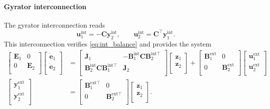 \documentclass{svjour3}                     %
\begin{document}
\paragraph{Gyrator interconnection}
The gyrator interconnection reads
\begin{equation*}
\mathbf{u}_1^{\text{int}} = -\mathbf{C} \mathbf{y}_2^{\text{int}}, \qquad
\mathbf{u}_2^{\text{int}} = \mathbf{C}^\top \mathbf{y}_1^{\text{int}}.
\end{equation*}
This interconnection verifies \eqref{eq:int_balance} and provides the system
\begin{align*}
\begin{bmatrix}
\mathbf{E}_1 & 0 \\ 0 & \mathbf{E}_2 \\
\end{bmatrix}
\begin{bmatrix}
\dot{\mathbf{e}}_1 \\ \dot{\mathbf{e}}_2 \\
\end{bmatrix} &= 
\begin{bmatrix}
\mathbf{J}_1 & -\mathbf{B}_1^{\text{int}} \mathbf{C} \mathbf{B}_2^{\text{int} \top} \\ 
\mathbf{B}_2^{\text{int}} \mathbf{C} \mathbf{B}_1^{\text{int} \top}  & \mathbf{J}_2 \\
\end{bmatrix}
\begin{bmatrix}
\mathbf{z}_1 \\ 
\mathbf{z}_2 \\
\end{bmatrix}+ 
\begin{bmatrix}
\mathbf{B}_1^{\text{ext}} & 0 \\ 0 & \mathbf{B}_2^{\text{ext}} \\
\end{bmatrix} 
\begin{bmatrix}
\mathbf{u}_1^{\text{ext}} \\ \mathbf{u}_2^{\text{ext}} \\
\end{bmatrix}  \\
\begin{bmatrix}
\mathbf{y}_1^{\text{ext}} \\ \mathbf{y}_2^{\text{ext}} \\
\end{bmatrix}  &= \begin{bmatrix}
\mathbf{B}_1^{\text{ext} \top} & 0 \\
0 & \mathbf{B}_2^{\text{ext} \top} \\
\end{bmatrix} \begin{bmatrix}
\mathbf{z}_1 \\ 
\mathbf{z}_2 \\
\end{bmatrix}.
\end{align*}
\end{document}
